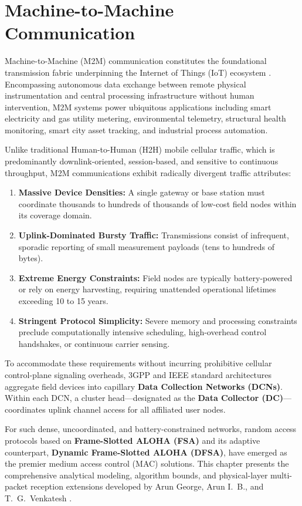\chapter{Machine-to-Machine Communication}
\label{sec:chapter5}

Machine-to-Machine (M2M) communication constitutes the foundational transmission fabric underpinning the Internet of Things (IoT) ecosystem \cite{george2018performance, george2020multipacket}. Encompassing autonomous data exchange between remote physical instrumentation and central processing infrastructure without human intervention, M2M systems power ubiquitous applications including smart electricity and gas utility metering, environmental telemetry, structural health monitoring, smart city asset tracking, and industrial process automation.

Unlike traditional Human-to-Human (H2H) mobile cellular traffic, which is predominantly downlink-oriented, session-based, and sensitive to continuous throughput, M2M communications exhibit radically divergent traffic attributes:
\begin{enumerate}
    \item \textbf{Massive Device Densities:} A single gateway or base station must coordinate thousands to hundreds of thousands of low-cost field nodes within its coverage domain.
    \item \textbf{Uplink-Dominated Bursty Traffic:} Transmissions consist of infrequent, sporadic reporting of small measurement payloads (tens to hundreds of bytes).
    \item \textbf{Extreme Energy Constraints:} Field nodes are typically battery-powered or rely on energy harvesting, requiring unattended operational lifetimes exceeding 10 to 15 years.
    \item \textbf{Stringent Protocol Simplicity:} Severe memory and processing constraints preclude computationally intensive scheduling, high-overhead control handshakes, or continuous carrier sensing.
\end{enumerate}

To accommodate these requirements without incurring prohibitive cellular control-plane signaling overheads, 3GPP and IEEE standard architectures aggregate field devices into capillary \textbf{Data Collection Networks (DCNs)}. Within each DCN, a cluster head—designated as the \textbf{Data Collector (DC)}—coordinates uplink channel access for all affiliated user nodes.

For such dense, uncoordinated, and battery-constrained networks, random access protocols based on \textbf{Frame-Slotted ALOHA (FSA)} and its adaptive counterpart, \textbf{Dynamic Frame-Slotted ALOHA (DFSA)}, have emerged as the premier medium access control (MAC) solutions. This chapter presents the comprehensive analytical modeling, algorithm bounds, and physical-layer multi-packet reception extensions developed by Arun George, Arun I.~B., and T.~G.~Venkatesh \cite{george2018performance, george2020multipacket, arun2013order}.

